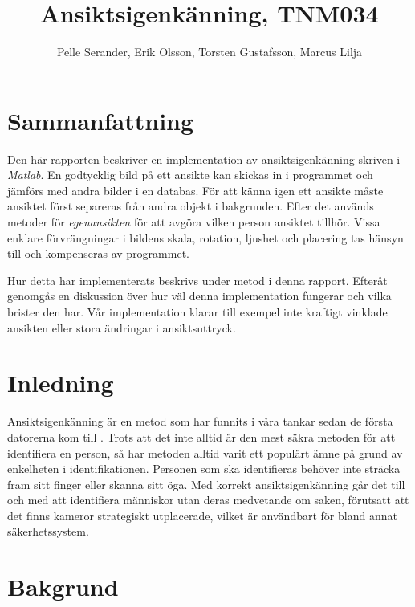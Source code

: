 \documentclass[a4paper,12pt,oneside,final]{extbook}
\title{Ansiktsigenkänning, TNM034}
\author{Pelle Serander, Erik Olsson, Torsten Gustafsson, Marcus Lilja}
\begin{document}
\pagestyle{empty}
\thispagestyle{empty}

\frontmatter

\maketitle

\pagestyle{fancy}

\chapter{Sammanfattning}

Den här rapporten beskriver en implementation av ansiktsigenkänning skriven i \textit{Matlab}. En godtycklig bild på ett ansikte kan skickas in i programmet och jämförs med andra bilder i en databas. För att känna igen ett ansikte måste ansiktet först separeras från andra objekt i bakgrunden. Efter det används metoder för \textit{egenansikten} för att avgöra vilken person ansiktet tillhör. Vissa enklare förvrängningar i bildens skala, rotation, ljushet och placering tas hänsyn till och kompenseras av programmet. 

Hur detta har implementerats beskrivs under metod i denna rapport. Efteråt genomgås en diskussion över hur väl denna implementation fungerar och vilka brister den har. Vår implementation klarar till exempel inte kraftigt vinklade ansikten eller stora ändringar i ansiktsuttryck.

\tableofcontents

\mainmatter

\chapter{Inledning}

Ansiktsigenkänning är en metod som har funnits i våra tankar sedan de första datorerna kom till \cite{history}. Trots att det inte alltid är den mest säkra metoden för att identifiera en person, så har metoden alltid varit ett populärt ämne på grund av enkelheten i identifikationen. Personen som ska identifieras behöver inte sträcka fram sitt finger eller skanna sitt öga. Med korrekt ansiktsigenkänning går det till och med att identifiera människor utan deras medvetande om saken, förutsatt att det finns kameror strategiskt utplacerade, vilket är användbart för bland annat säkerhetssystem.


\chapter{Bakgrund}
\end{document}
